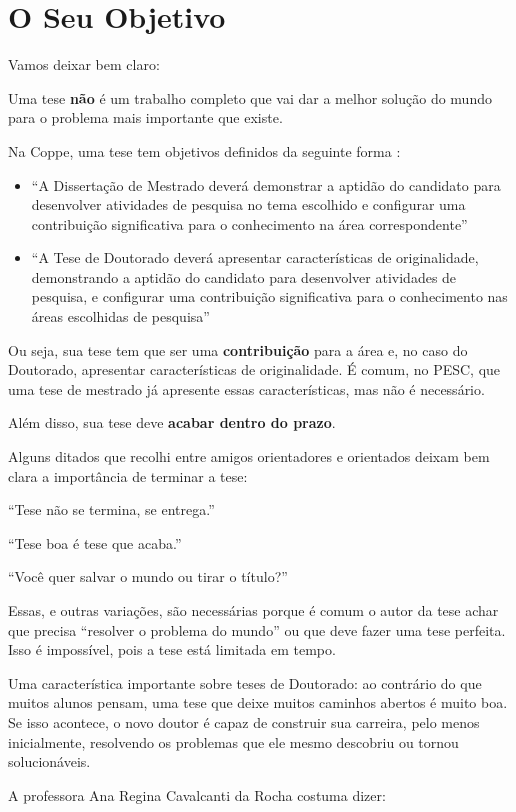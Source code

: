 \chapter{O Seu Objetivo}

Vamos deixar bem claro:



Uma tese \textbf{não} é um trabalho completo que vai dar a melhor solução do mundo para o problema mais importante que existe.

Na Coppe, uma tese tem objetivos definidos da seguinte forma :
\begin{itemize}
\item	``A Dissertação de Mestrado deverá demonstrar a aptidão do candidato para desenvolver atividades de pesquisa no tema escolhido e configurar uma contribuição significativa para o conhecimento na área correspondente''
\item	``A Tese de Doutorado deverá apresentar características de originalidade, demonstrando a aptidão do candidato para desenvolver atividades de pesquisa, e configurar uma contribuição significativa para o conhecimento nas áreas escolhidas de pesquisa''
\end{itemize}

Ou seja, sua tese tem que ser uma \textbf{contribuição} para a área e, no caso do Doutorado, apresentar características de originalidade. É comum, no PESC, que uma tese de mestrado já apresente essas características, mas não é necessário.


Além disso, sua tese deve \textbf{acabar dentro do prazo}.

Alguns ditados que recolhi entre amigos orientadores e orientados deixam bem clara a importância de terminar a tese:


``Tese não se termina, se entrega.''

``Tese boa é tese que acaba.''

``Você quer salvar o mundo ou tirar o título?''

Essas, e outras variações, são necessárias porque é comum o autor da tese achar que precisa “resolver o problema do mundo” ou que deve fazer uma tese perfeita. Isso é impossível, pois a tese está limitada em tempo.

Uma característica importante sobre teses de Doutorado: ao contrário do que muitos alunos pensam, uma tese que deixe muitos caminhos abertos é muito boa. Se isso acontece, o novo doutor é capaz de construir sua carreira, pelo menos inicialmente, resolvendo os problemas que ele mesmo descobriu ou tornou solucionáveis.

A professora Ana Regina Cavalcanti da Rocha costuma dizer:



